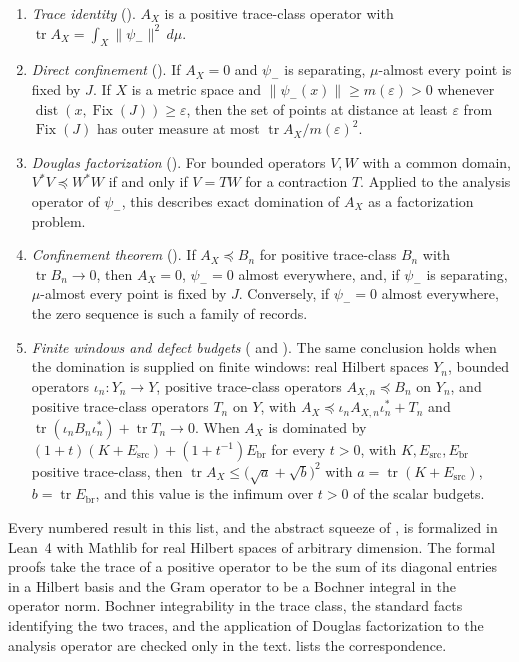 \documentclass[11pt]{article}
\DeclareMathOperator{\Fix}{Fix}
\DeclareMathOperator{\dist}{dist}
\DeclareMathOperator{\trace}{tr}
\newcommand{\psim}{\psi_{-}}
\newcommand{\AX}{A_{X}}
\theoremstyle{definition}
\begin{document}
\begin{enumerate}
  \item \emph{Trace identity}
    ().  \(\AX\) is a
    positive trace-class operator with
    \(\trace\AX=\int_X\|\psim\|^2\,d\mu\).
  \item \emph{Direct confinement}
    ().
    If \(\AX=0\) and \(\psim\) is separating, \(\mu\)-almost every
    point is fixed by \(J\).  If \(X\) is a metric space and
    \(\|\psim(x)\|\geq m(\varepsilon)>0\) whenever
    \(\dist(x,\Fix(J))\geq\varepsilon\), then the set of points at
    distance at least \(\varepsilon\) from \(\Fix(J)\) has outer measure
    at most \(\trace\AX/m(\varepsilon)^2\).
  \item \emph{Douglas factorization}
    ().  For bounded
    operators \(V,W\) with a common domain,
    \(V^*V\preceq W^*W\) if and only if \(V=TW\) for a contraction
    \(T\).  Applied to the analysis operator of \(\psim\), this
    describes exact domination of \(\AX\) as a factorization problem.
  \item \emph{Confinement theorem}
    ().  If
    \(\AX\preceq B_n\) for positive trace-class \(B_n\) with
    \(\trace B_n\to0\), then \(\AX=0\), \(\psim=0\) almost
    everywhere, and, if \(\psim\) is separating, \(\mu\)-almost every
    point is fixed by \(J\).  Conversely, if \(\psim=0\) almost
    everywhere, the zero sequence is such a family of records.
  \item \emph{Finite windows and defect budgets}
    ( and
    ).
    The same conclusion holds when the domination is supplied on
    finite windows: real Hilbert spaces \(Y_n\), bounded operators
    \(\iota_n:Y_n\to Y\), positive trace-class operators
    \(A_{X,n}\preceq B_n\) on \(Y_n\), and positive trace-class
    operators \(T_n\) on \(Y\), with
    \(\AX\preceq\iota_nA_{X,n}\iota_n^*+T_n\) and
    \(\trace(\iota_nB_n\iota_n^*)+\trace T_n\to0\).  When \(\AX\) is dominated by
    \((1+t)(K+E_{\mathrm{src}})+(1+t^{-1})E_{\mathrm{br}}\) for every
    \(t>0\), with \(K,E_{\mathrm{src}},E_{\mathrm{br}}\) positive
    trace-class, then
    \(\trace\AX\leq\bigl(\sqrt a+\sqrt b\bigr)^2\) with
    \(a=\trace(K+E_{\mathrm{src}})\), \(b=\trace E_{\mathrm{br}}\), and
    this value is the infimum over \(t>0\) of the scalar budgets.
\end{enumerate}
Every numbered result in this list, and the abstract squeeze of
, is formalized in Lean~4
with Mathlib for real Hilbert spaces of arbitrary dimension.  The formal
proofs take the trace of a positive operator to be the sum of its
diagonal entries in a Hilbert basis and the Gram operator to be a
Bochner integral in the operator norm.  Bochner integrability in the
trace class, the standard facts identifying the two traces, and the
application of Douglas factorization to the analysis operator are
checked only in the text.   lists the
correspondence.
\end{document}
